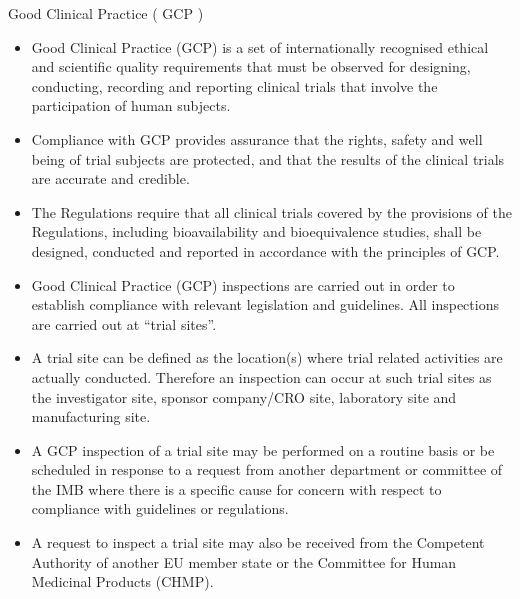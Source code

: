 Good Clinical Practice ( GCP )

\begin{itemize}
\item Good Clinical Practice (GCP) is a set of internationally recognised ethical and scientific quality requirements that must be observed for designing, conducting, recording and reporting clinical trials that involve the participation of human subjects. 

\item  Compliance with GCP provides assurance that the rights, safety and well being of trial subjects are protected, and that the results of the clinical trials are accurate and credible.  

\item  The Regulations require that all clinical trials covered by the provisions of the Regulations, including bioavailability and bioequivalence studies, shall be designed, conducted and reported in accordance with the principles of GCP. 

\item Good Clinical Practice (GCP) inspections are carried out in order to establish compliance with relevant legislation and guidelines. All inspections are carried out at “trial sites”.  

\item  A trial site can be defined as the location(s) where trial related activities are actually conducted.  Therefore an inspection can occur at such trial sites as the investigator site, sponsor company/CRO site, laboratory site and manufacturing site.  

\item A GCP inspection of a trial site may be performed on a routine basis or be scheduled in response to a request from another department or committee of the IMB where there is a specific cause for concern with respect to compliance with guidelines or regulations. 

\item A request to inspect a trial site may also be received from the Competent Authority of another EU member state or the Committee for Human Medicinal Products (CHMP).
\end{itemize}

